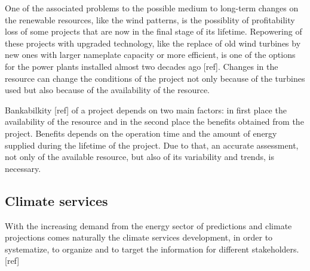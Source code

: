 One of the associated problems to the possible medium to long-term changes on the renewable resources, like the wind patterns, is the possiblity of profitability loss of some projects that are now in the final stage of its lifetime. Repowering of these projects with upgraded technology, like the replace of old wind turbines by new ones with larger nameplate capacity or more efficient, is one of the options for the power plants installed almost two decades ago [ref]. Changes in the resource can change the conditions of the project not only because of the turbines used but also because of the availability of the resource.  
 

Bankabilkity [ref] of a project depends on two main factors: in first place the availability of the resource and in the second place the benefits obtained from the project. Benefits depends on the operation time and the amount of energy supplied during the lifetime of the project. Due to that, an accurate assessment, not only of the available resource, but also of its variability and trends, is necessary. 


\subsection{Climate services}


With the increasing demand from the energy sector of predictions and climate projections comes naturally the climate services development, in order to systematize, to organize and to target the information for different stakeholders. [ref]

